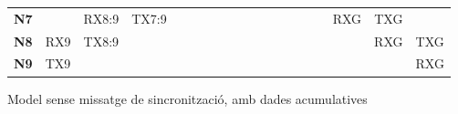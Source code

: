 \documentclass{tfgitic}[2024/07/01]
\begin{document}
{\begin{figure}
{\begin{tabular}{l||cccccccccccccccccc}
            \cline{3-5}\cline{16-18}
            \textbf{N7} & \multicolumn{1}{c|}{}    & \multicolumn{1}{c|}{RX8:9} & \multicolumn{1}{c|}{TX7:9} &                            &                            &                            &                            &                            &                            &                                                              &                                                              &                                                              &                                                              &                          & \multicolumn{1}{c|}{}    & \multicolumn{1}{c|}{RXG} & \multicolumn{1}{c|}{TXG} &                           \\ 
            \cline{2-4}\cline{17-19}
            \textbf{N8} & \multicolumn{1}{c|}{RX9} & \multicolumn{1}{c|}{TX8:9} &                            &                            &                            &                            &                            &                            &                            &                                                              &                                                              &                                                              &                                                              &                          &                          & \multicolumn{1}{c|}{}    & \multicolumn{1}{c|}{RXG} & \multicolumn{1}{c|}{TXG}  \\ 
            \cline{2-3}\cline{18-19}
            \textcolor[rgb]{0.1,1,0.2}{\textbf{N9}} & \multicolumn{1}{c|}{TX9} &                            &                            &                            &                            &                            &                            &                            &                            &                                                              &                                                              &                                                              &                                                              &                          &                          &                          & \multicolumn{1}{c|}{}    & \multicolumn{1}{c|}{RXG}  \\
            \cline{2-2}\cline{19-19}
        \end{tabular}
    }
    \caption{Model sense missatge de sincronització, amb dades acumulatives}
    \label{fig:noSyncAcumulatiu}
\end{figure}

\listoftables
\listoffigures

}
\end{document}
